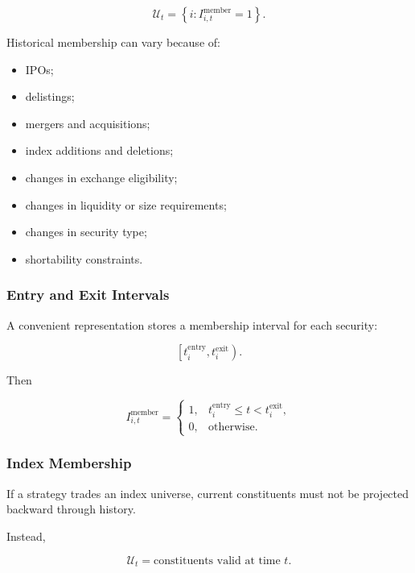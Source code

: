 \documentclass[11pt,a4paper]{article}
\begin{document}
\begin{equation}
\boxed{
\mathcal{U}_t
=
\left\{
i:
I_{i,t}^{\mathrm{member}}=1
\right\}.
}
\end{equation}

Historical membership can vary because of:

\begin{itemize}
    \item IPOs;
    \item delistings;
    \item mergers and acquisitions;
    \item index additions and deletions;
    \item changes in exchange eligibility;
    \item changes in liquidity or size requirements;
    \item changes in security type;
    \item shortability constraints.
\end{itemize}


\subsubsection{Entry and Exit Intervals}

A convenient representation stores a membership interval for each security:

\begin{equation}
\left[
t_i^{\mathrm{entry}},
t_i^{\mathrm{exit}}
\right).
\end{equation}

Then

\begin{equation}
I_{i,t}^{\mathrm{member}}
=
\begin{cases}
1,
&
t_i^{\mathrm{entry}}
\leq
t
<
t_i^{\mathrm{exit}},
\\
0,
&
\text{otherwise}.
\end{cases}
\end{equation}


\subsubsection{Index Membership}

If a strategy trades an index universe, current constituents must not be
projected backward through history.

Instead,

\begin{equation}
\boxed{
\mathcal{U}_t
=
\text{constituents valid at time }t.
}
\end{equation}
\end{document}
